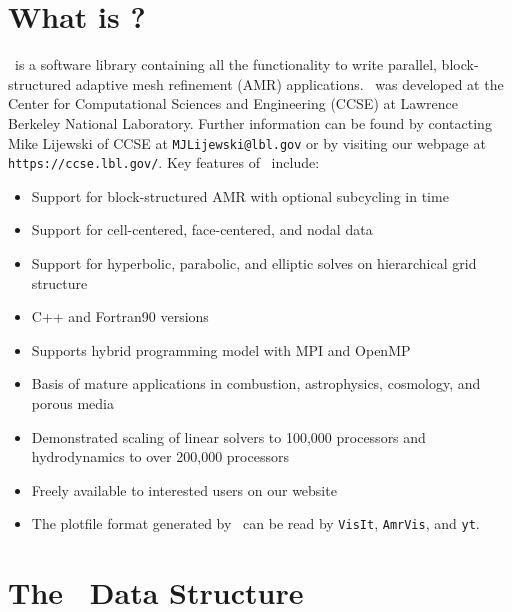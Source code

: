 \section{What is \BoxLib?}

\BoxLib\ is a software library containing all the functionality to write parallel, 
block-structured adaptive mesh refinement (AMR) applications.  \BoxLib\ was developed 
at the Center for Computational Sciences and Engineering (CCSE) at Lawrence Berkeley 
National Laboratory.  Further information can be found by contacting Mike Lijewski 
of CCSE at {\tt MJLijewski@lbl.gov} or by visiting our webpage
at {\tt https://ccse.lbl.gov/}.  Key features of \BoxLib\ include:

\begin{itemize}
\item Support for block-structured AMR with optional subcycling in time
\item Support for cell-centered, face-centered, and nodal data
\item Support for hyperbolic, parabolic, and elliptic solves on hierarchical grid structure
\item C++ and Fortran90 versions
\item Supports hybrid programming model with MPI and OpenMP
\item Basis of mature applications in combustion, astrophysics, cosmology, and porous media
\item Demonstrated scaling of linear solvers to 100,000 processors and 
      hydrodynamics to over 200,000 processors
\item Freely available to interested users on our website
\item The plotfile format generated by \BoxLib\ can be read by {\tt VisIt}, {\tt AmrVis},
      and {\tt yt}.
\end{itemize}

\section{The \MultiFab\ Data Structure}


